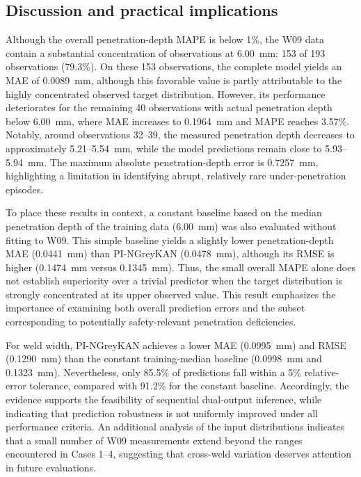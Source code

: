 \subsection{Discussion and practical implications}
\label{sec:w09_discussion}

Although the overall penetration-depth MAPE is below 1\%, the W09 data contain a substantial concentration of observations at 6.00~mm: 153 of 193 observations (79.3\%). On these 153 observations, the complete model yields an MAE of 0.0089~mm, although this favorable value is partly attributable to the highly concentrated observed target distribution. However, its performance deteriorates for the remaining 40 observations with actual penetration depth below 6.00~mm, where MAE increases to 0.1964~mm and MAPE reaches 3.57\%. Notably, around observations 32--39, the measured penetration depth decreases to approximately 5.21--5.54~mm, while the model predictions remain close to 5.93--5.94~mm. The maximum absolute penetration-depth error is 0.7257~mm, highlighting a limitation in identifying abrupt, relatively rare under-penetration episodes.

To place these results in context, a constant baseline based on the median penetration depth of the training data (6.00~mm) was also evaluated without fitting to W09. This simple baseline yields a slightly lower penetration-depth MAE (0.0441~mm) than PI-NGreyKAN (0.0478~mm), although its RMSE is higher (0.1474~mm versus 0.1345~mm). Thus, the small overall MAPE alone does not establish superiority over a trivial predictor when the target distribution is strongly concentrated at its upper observed value. This result emphasizes the importance of examining both overall prediction errors and the subset corresponding to potentially safety-relevant penetration deficiencies.

For weld width, PI-NGreyKAN achieves a lower MAE (0.0995~mm) and RMSE (0.1290~mm) than the constant training-median baseline (0.0998~mm and 0.1323~mm). Nevertheless, only 85.5\% of predictions fall within a 5\% relative-error tolerance, compared with 91.2\% for the constant baseline. Accordingly, the evidence supports the feasibility of sequential dual-output inference, while indicating that prediction robustness is not uniformly improved under all performance criteria. An additional analysis of the input distributions indicates that a small number of W09 measurements extend beyond the ranges encountered in Cases 1--4, suggesting that cross-weld variation deserves attention in future evaluations.

